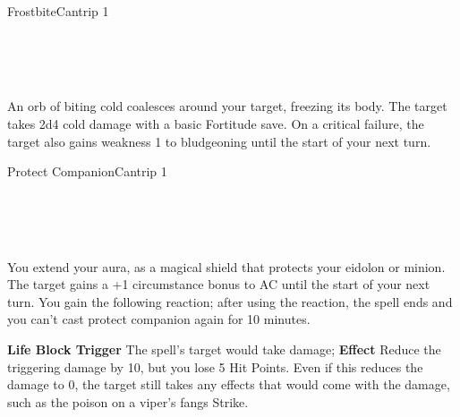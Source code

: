 \documentclass[12pt,openany,twocolumn]{book}
\begin{document}
\begin{spell}{Frostbite}{}{Cantrip 1}
    \begin{spellinfo}
         \\
         \\
         \\
    \end{spellinfo}

    \begin{spellbody}
        An orb of biting cold coalesces around your target, freezing its body. The target takes 2d4 cold damage with a basic Fortitude save. On a critical failure, the target also gains weakness 1 to bludgeoning until the start of your next turn.
    \end{spellbody}


\end{spell}

\begin{spell}{Protect Companion}{}{Cantrip 1}
    \begin{spellinfo}
         \\
         \\
         \\
    \end{spellinfo}

    \begin{spellbody}
        You extend your aura, as a magical shield that protects your eidolon or minion. The target gains a +1 circumstance bonus to AC until the start of your next turn. You gain the following reaction; after using the reaction, the spell ends and you can't cast protect companion again for 10 minutes.

        \textbf{Life Block \reaction Trigger} The spell's target would take damage;
        \textbf{Effect} Reduce the triggering damage by 10, but you lose 5 Hit Points. Even if this reduces the damage to 0, the target still takes any effects that would come with the damage, such as the poison on a viper's fangs Strike.
    \end{spellbody}


\end{spell}
\end{document}
